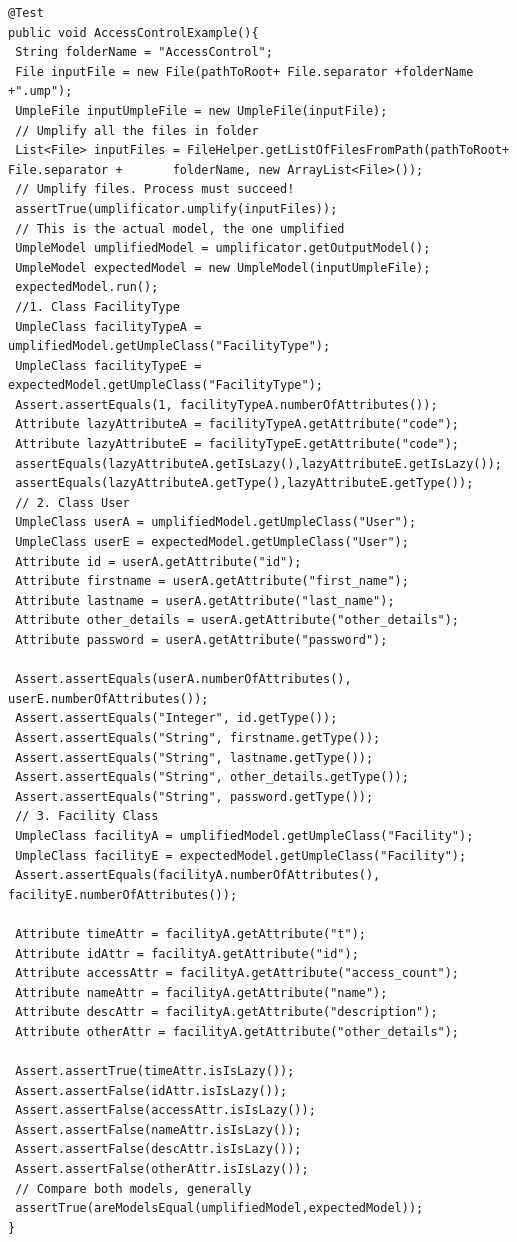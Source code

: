 \begin{lstlisting}[style=java,label={lst:acsExample},caption=Unit test to assert the access control example.]
@Test
public void AccessControlExample(){
 String folderName = "AccessControl";
 File inputFile = new File(pathToRoot+ File.separator +folderName +".ump");
 UmpleFile inputUmpleFile = new UmpleFile(inputFile);
 // Umplify all the files in folder
 List<File> inputFiles = FileHelper.getListOfFilesFromPath(pathToRoot+ File.separator +       folderName, new ArrayList<File>());
 // Umplify files. Process must succeed!
 assertTrue(umplificator.umplify(inputFiles));
 // This is the actual model, the one umplified 
 UmpleModel umplifiedModel = umplificator.getOutputModel();
 UmpleModel expectedModel = new UmpleModel(inputUmpleFile);
 expectedModel.run();		
 //1. Class FacilityType
 UmpleClass facilityTypeA = umplifiedModel.getUmpleClass("FacilityType");
 UmpleClass facilityTypeE = expectedModel.getUmpleClass("FacilityType");		
 Assert.assertEquals(1, facilityTypeA.numberOfAttributes());
 Attribute lazyAttributeA = facilityTypeA.getAttribute("code");
 Attribute lazyAttributeE = facilityTypeE.getAttribute("code");	
 assertEquals(lazyAttributeA.getIsLazy(),lazyAttributeE.getIsLazy());
 assertEquals(lazyAttributeA.getType(),lazyAttributeE.getType());		
 // 2. Class User
 UmpleClass userA = umplifiedModel.getUmpleClass("User");
 UmpleClass userE = expectedModel.getUmpleClass("User");	
 Attribute id = userA.getAttribute("id");
 Attribute firstname = userA.getAttribute("first_name");
 Attribute lastname = userA.getAttribute("last_name");
 Attribute other_details = userA.getAttribute("other_details");
 Attribute password = userA.getAttribute("password");
		
 Assert.assertEquals(userA.numberOfAttributes(), userE.numberOfAttributes());
 Assert.assertEquals("Integer", id.getType());
 Assert.assertEquals("String", firstname.getType());
 Assert.assertEquals("String", lastname.getType());
 Assert.assertEquals("String", other_details.getType());
 Assert.assertEquals("String", password.getType());
 // 3. Facility Class
 UmpleClass facilityA = umplifiedModel.getUmpleClass("Facility");
 UmpleClass facilityE = expectedModel.getUmpleClass("Facility");
 Assert.assertEquals(facilityA.numberOfAttributes(), facilityE.numberOfAttributes());

 Attribute timeAttr = facilityA.getAttribute("t");
 Attribute idAttr = facilityA.getAttribute("id");
 Attribute accessAttr = facilityA.getAttribute("access_count");
 Attribute nameAttr = facilityA.getAttribute("name");
 Attribute descAttr = facilityA.getAttribute("description");
 Attribute otherAttr = facilityA.getAttribute("other_details");
		
 Assert.assertTrue(timeAttr.isIsLazy());
 Assert.assertFalse(idAttr.isIsLazy());
 Assert.assertFalse(accessAttr.isIsLazy());
 Assert.assertFalse(nameAttr.isIsLazy());
 Assert.assertFalse(descAttr.isIsLazy());
 Assert.assertFalse(otherAttr.isIsLazy());
 // Compare both models, generally
 assertTrue(areModelsEqual(umplifiedModel,expectedModel));
}
\end{lstlisting}


